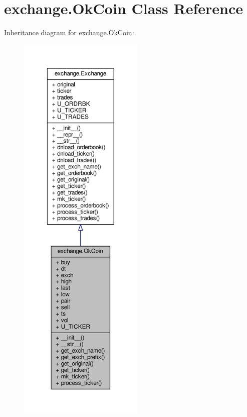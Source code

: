 \hypertarget{classexchange_1_1_ok_coin}{}\section{exchange.\+Ok\+Coin Class Reference}
\label{classexchange_1_1_ok_coin}


Inheritance diagram for exchange.\+Ok\+Coin\+:\nopagebreak
\begin{figure}[H]
\begin{center}
\leavevmode
\includegraphics[height=550pt]{classexchange_1_1_ok_coin__inherit__graph}
\end{center}
\end{figure}


